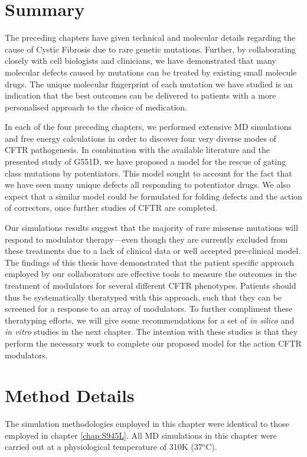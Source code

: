 \section{Summary}
The preceding chapters have given technical and molecular details regarding the cause of Cystic Fibrosis due to rare genetic mutations. Further, by collaborating closely with cell biologists and clinicians, we have demonstrated that many molecular defects caused by mutations can be treated by existing small molecule drugs. The unique molecular fingerprint of each mutation we have studied is an indication that the best outcomes can be delivered to patients with a more personalised approach to the choice of medication. 

In each of the four preceding chapters, we performed extensive MD simulations and free energy calculations in order to discover four very diverse modes of CFTR pathogenesis. In combination with the available literature and the presented study of G551D, we have proposed a model for the rescue of gating class mutations by potentiators. This model sought to account for the fact that we have seen many unique defects all responding to potentiator drugs. We also expect that a similar model could be formulated for folding defects and the action of correctors, once further studies of CFTR are completed. 

Our simulations results suggest that the majority of rare missense mutations will respond to modulator therapy---even though they are currently excluded from these treatments due to a lack of clinical data or well accepted pre-clinical model. The findings of this thesis have demonstrated that the patient specific approach employed by our collaborators are effective tools to measure the outcomes in the treatment of modulators for several different CFTR phenotypes. Patients should thus be systematically theratyped with this approach, such that they can be screened for a response to an array of modulators. To further compliment these theratyping efforts, we will give some recommendations for a set of \textit{in silico} and \textit{in vitro} studies in the next chapter. The intention with these studies is that they perform the necessary work to complete our proposed model for the action CFTR modulators.



\section{Method Details}
The simulation methodologies employed in this chapter were identical to those employed in chapter \ref{chap:S945L}. All MD simulations in this chapter were carried out at a physiological temperature of 310K (37$^o$C).

